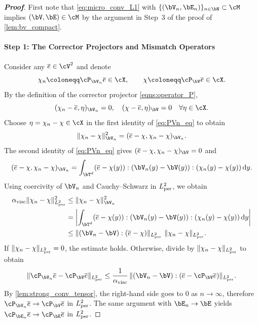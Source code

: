\begin{proof}[\bf Proof]
First note that \cref{eq:micro_conv_L1} with $\{(\bV_n,\bE_n)\}_{n\in\bN}\subset\cM$ implies $(\bV,\bE)\in\cM$ by the argument in Step~3 of the proof of \cref{lem:bv_compact}.

\paragraph{Step 1: The Corrector Projectors and Mismatch Operators}
Consider any $\overline{e}\in\cV^{2}$ and denote
\begin{equation*}
\chi_n\coloneqq\cP_{\bV_n}\overline{e}\in\cX,\qquad \chi\coloneqq\cP_{\bV}\overline{e}\in\cX.
\end{equation*}
By the definition of the corrector projector \cref{eqns:operator_P},
\begin{equation}\label{eq:PVn_eq}
(\chi_n-\overline{e},\eta)_{\bV_n}=0,
\quad
(\chi-\overline{e},\eta)_{\bV}=0\quad\forall \eta\in\cX.
\end{equation}
Choose $\eta=\chi_n-\chi\in\cX$ in the first identity of \cref{eq:PVn_eq} to obtain
\begin{equation*}
\|\chi_n-\chi\|_{\bV_n}^2=(\overline{e}-\chi,\chi_n-\chi)_{\bV_n}.
\end{equation*}
The second identity of \cref{eq:PVn_eq} gives
$(\overline{e}-\chi,\chi_n-\chi)_{\bV}=0$ and
\begin{equation*}
(\overline{e}-\chi,\chi_n-\chi)_{\bV_n}
=\int_{\bT^d} (\overline{e}-\chi(y)):(\bV_n(y)-\bV(y)):(\chi_n(y)-\chi(y))\,\mathrm{d}y.
\end{equation*}
Using coercivity of $\bV_n$ and Cauchy--Schwarz in $L^2_{\rm per}$, we obtain
\begin{align}\label{eq:PV_estimate}
\alpha_{\rm visc}\|\chi_n-\chi\|_{L^2_{\rm per}}^2
&\leq
\|\chi_n-\chi\|^2_{\bV_n}\nonumber\\
&=\left|\int_{\bT^d} (\overline{e}-\chi(y)):(\bV_n(y)-\bV(y)):(\chi_n(y)-\chi(y))\,\mathrm{d}y\right| \nonumber\\
&\leq \|(\bV_n-\bV):(\overline{e}-\chi)\|_{L^2_{\rm per}}\ \|\chi_n-\chi\|_{L^2_{\rm per}}.
\end{align}
If $\|\chi_n-\chi\|_{L^2_{\rm per}}=0$, the estimate holds. Otherwise, divide by $\|\chi_n-\chi\|_{L^2_{\rm per}}$ to obtain
\begin{equation*}
\|\cP_{\bV_n}\overline{e}-\cP_{\bV}\overline{e}\|_{L^2_{\rm per}}
\le
\frac{1}{\alpha_{\rm visc}}\,\|(\bV_n-\bV):(\overline{e}-\cP_{\bV}\overline{e})\|_{L^2_{\rm per}}.
\end{equation*}
By \cref{lem:strong_conv_tensor}, the right-hand side goes to $0$ as $n\to\infty$, therefore $\cP_{\bV_n}\overline{e}\to\cP_{\bV}\overline{e}$ in $L^2_{\rm per}$. The same argument with $\bE_n\to\bE$ yields $\cP_{\bE_n}\overline{e}\to\cP_{\bE}\overline{e}$ in $L^2_{\rm per}$.


\end{proof}

